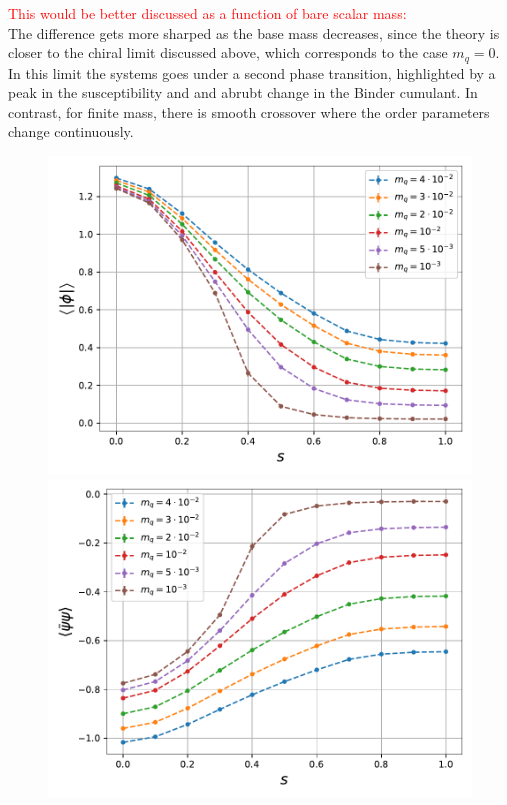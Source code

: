 \textcolor{red}{This would be better discussed as a function of bare scalar mass:} \\
The difference gets more sharped as the base mass decreases, since the theory is closer to the chiral limit discussed above, which corresponds to the case $m_q=0$. In this limit the systems goes under a second phase transition, highlighted by a peak in the susceptibility and and abrubt change in the Binder cumulant. In contrast, for finite mass,  there is smooth crossover where the order parameters change continuously.

\begin{figure}[h]
\centering
\begin{minipage}{0.45\textwidth}	
	\includegraphics[scale=0.48]{figures/chiral_PT/magnetisation.pdf}
\end{minipage}
\hfill
\begin{minipage}{0.45\textwidth}	
	\includegraphics[scale=0.48]{figures/chiral_PT/condensate.pdf}

\end{minipage}
\end{figure}
